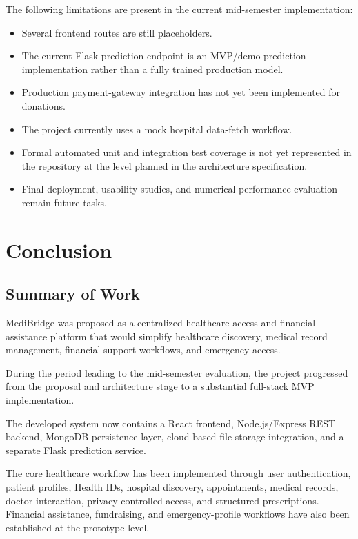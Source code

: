 \documentclass{tietreport}
\begin{document}
The following limitations are present in the current mid-semester
implementation:

\begin{itemize}
  \item Several frontend routes are still placeholders.
  \item The current Flask prediction endpoint is an MVP/demo prediction
    implementation rather than a fully trained production model.
  \item Production payment-gateway integration has not yet been
    implemented for donations.
  \item The project currently uses a mock hospital data-fetch workflow.
  \item Formal automated unit and integration test coverage is not yet
    represented in the repository at the level planned in the
    architecture specification.
  \item Final deployment, usability studies, and numerical performance
    evaluation remain future tasks.
\end{itemize}


\chapter{Conclusion}

\section{Summary of Work}

MediBridge was proposed as a centralized healthcare access and financial
assistance platform that would simplify healthcare discovery, medical
record management, financial-support workflows, and emergency access.

During the period leading to the mid-semester evaluation, the project
progressed from the proposal and architecture stage to a substantial
full-stack MVP implementation.

The developed system now contains a React frontend, Node.js/Express
REST backend, MongoDB persistence layer, cloud-based file-storage
integration, and a separate Flask prediction service.

The core healthcare workflow has been implemented through user
authentication, patient profiles, Health IDs, hospital discovery,
appointments, medical records, doctor interaction, privacy-controlled
access, and structured prescriptions. Financial assistance,
fundraising, and emergency-profile workflows have also been established
at the prototype level.
\end{document}
